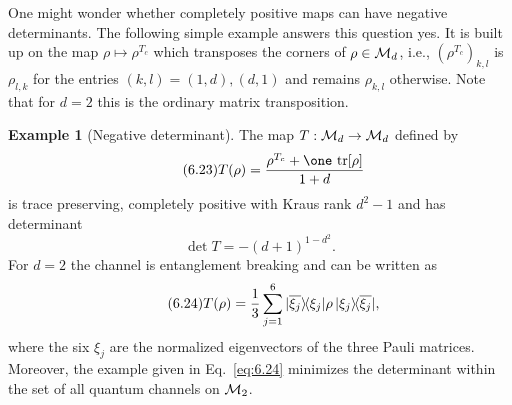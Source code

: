\documentclass[11pt,a4paper]{article}
\theoremstyle{plain}
\theoremstyle{definition}
\newtheorem{example}{Example}[section]
\theoremstyle{remark}
\begin{document}
One might wonder whether completely positive maps can have negative determinants.
The following simple example answers this question yes. It is built
up on the map $\rho\mapsto \rho^{T_c}$ which transposes the corners of $\rho\in\mathcal{M}_d$,
i.e., $(\rho^{T_c})_{k,l}$ is $\rho_{l,k}$ for the entries $(k,l)=(1,d),(d,1)$ and
remains $\rho_{k,l}$ otherwise. Note that for $d=2$ this is the ordinary matrix
transposition.

\begin{example}[Negative determinant]
    The map $T:\mathcal{M}_d\to\mathcal{M}_d$ defined by
    \begin{equation}\tag{6.23}\label{eq:6.23}
        T(\rho)=\frac{\rho^{T_c} + \one\,\tr[\rho]}{1+d}
    \end{equation}
    is trace preserving, completely positive with Kraus rank $d^2-1$ and has determinant
    \[
        \det T = -(d+1)^{1-d^2}.
    \]
    For $d=2$ the channel is entanglement breaking and can be written as
    \begin{equation}\tag{6.24}\label{eq:6.24}
        T(\rho)=\frac{1}{3}\sum_{j=1}^6
        |\overline{\xi_j}\rangle\!\langle\xi_j| \rho\,|\xi_j\rangle\!\langle\overline{\xi_j}|,
    \end{equation}
    where the six $\xi_j$ are the normalized eigenvectors of the three Pauli matrices.
    Moreover, the example given in Eq.~\eqref{eq:6.24} minimizes the determinant within
    the set of all quantum channels on $\mathcal{M}_2$.
\end{example}
\end{document}
